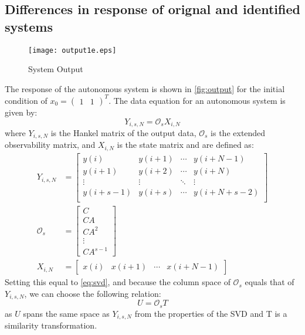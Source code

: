\documentclass[11pt,a4paper]{article}
\begin{document}
\subsection{Differences in response of orignal and identified systems}
\begin{figure}
    \centering
    \texttt{[image: output1e.eps]}
    \caption{System Output}
    \label{fig:output}
\end{figure}
The response of the autonomous system is shown in \autoref{fig:output} for the
initial condition of $ x_0 = \begin{pmatrix}1 & 1\end{pmatrix}^T $. The data
equation for an autonomous system is given by:
\begin{equation}
    \label{eq:dataeq}
    Y_{i, s, N} = \mathcal{O}_s X_{i, N}
\end{equation}
where $Y_{i, s, N}$ is the Hankel matrix of the output data, $\mathcal{O}_s$ is
the extended observability matrix, and $X_{i, N}$ is the state matrix and are
defined as:
\begin{align}
    Y_{i, s, N} &=
        \begin{bmatrix}
            y(i) & y(i + 1) & \cdots & y(i + N - 1) \\
            y(i + 1) & y(i + 2) & \cdots & y(i + N) \\
            \vdots & \vdots & \ddots & \vdots \\
            y(i + s - 1) & y(i + s) & \cdots & y(i + N + s - 2) \\
        \end{bmatrix} \label{eq:yhankel} \\
    \mathcal{O}_s &= \begin{bmatrix}
        C \\ CA \\ CA^2 \\ \vdots \\ CA^{s - 1}
        \end{bmatrix} \label{eq:extobs} \\
    X_{i, N} &= \begin{bmatrix} x(i) & x(i + 1) &
        \cdots & x(i + N - 1) \end{bmatrix} \label{eq:xhankel}
\end{align}
Setting this equal to \autoref{eq:svd}, and because the column space of
$\mathcal{O}_s$ equals that of $Y_{i, s, N}$, we can choose the following
relation:
\begin{equation}
    \label{eq:uo}
    U = \mathcal{O}_s T
\end{equation}
as $U$ spans the same space as $Y_{i, s, N}$ from the properties of the SVD and
T is a similarity transformation.
\end{document}
